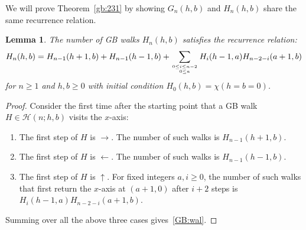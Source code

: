 \documentclass[12pt]{amsart}
\numberwithin{equation}{section}
\theoremstyle{plain}
\newtheorem{lemma}[theorem]{Lemma}
\theoremstyle{definition}
\newcommand{\Hw}{\mathcal{H}}
\begin{document}
We will prove Theorem~\ref{gb:231} by showing  $G_n(h,b)$ and $H_n(h,b)$ share the same recurrence relation. 

\begin{lemma}\label{lem:GB}
The number of GB walks $H_n(h,b)$ satisfies the recurrence relation:
\begin{equation}\label{GB:wal}
H_n(h,b)=H_{n-1}(h+1,b)+H_{n-1}(h-1,b)+\sum_{0\leq i\leq n-2\atop{0\leq a}}H_i(h-1,a)H_{n-2-i}(a+1,b)
\end{equation}
for $n\geq1$ and $h,b\geq0$ with initial condition $H_0(h,b)=\chi(h=b=0)$.
\end{lemma}
\begin{proof}
Consider the first time after the starting point that a GB walk $H\in\Hw(n;h,b)$ visits the $x$-axis: 
\begin{enumerate}
\item The first step of $H$ is $\rightarrow$. The number of such walks is $H_{n-1}(h+1,b)$.
\item The first step of $H$ is $\leftarrow$. The number of such walks is $H_{n-1}(h-1,b)$.
\item The first step of $H$ is $\uparrow$. For fixed integers $a,i\geq0$, the number of such walks that first return the $x$-axis at $(a+1,0)$ after $i+2$ steps is $H_i(h-1,a)H_{n-2-i}(a+1,b)$.
\end{enumerate}
Summing over all the above three cases gives~\eqref{GB:wal}.
\end{proof}
\end{document}
